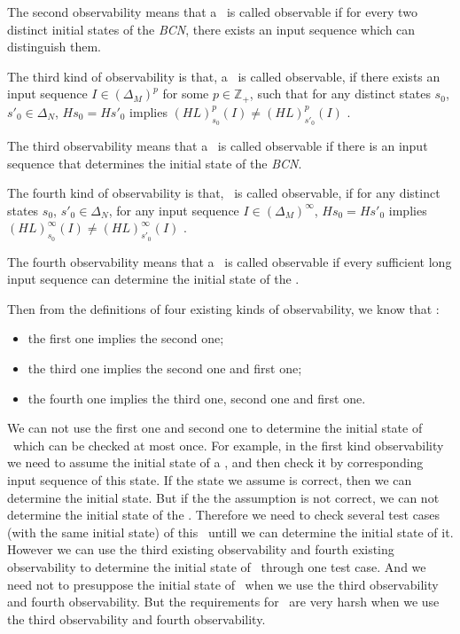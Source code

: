 The second observability means that a \BCN\ is called observable if for every two distinct initial states of the {\em BCN}, there exists an input sequence which can distinguish them. 
\begin{definition}
	The third kind of observability is that, a \BCN\ is called observable, if there exists an input sequence $I\in(\Delta_M)^p$ for some $p\in \mathbb{Z}_+$, such that for any distinct states $s_0$, ${s'}_0 \in \Delta_N$, $Hs_0=H{s'}_0$ implies $(HL)^p_{s_0}(I)\neq (HL)^p_{{s'}_0}(I)$ \cite{Cheng2011Identification}.
\end{definition}

The third observability means that a \BCN\ is called observable if there is an input sequence that determines the initial state of the {\em BCN}.
\begin{definition}
	The fourth kind of observability is that, \BCN\ is called observable, if for any distinct states $s_0$, ${s'}_0 \in \Delta_N$, for any input sequence $I\in(\Delta_M)^{\infty}$, $Hs_0=H{s'}_0$ implies $(HL)^{\infty}_{s_0}(I)\neq (HL)^{\infty}_{{s'}_0}(I)$ \cite{Fornasini2013Observability}.
\end{definition}

The fourth observability means that a \BCN\ is called observable if every sufficient long input sequence can determine the initial state of the \BCN.

Then from the definitions of  four existing kinds of observability, we know that \cite{Zhang2016Observability}:
\begin{itemize}
  \item the first one implies the second one;
  \item the third one implies the second one and first one;
  \item the fourth one implies the third one, second one and first one.
\end{itemize} 
 
We can not use the first one and second one to determine the initial state of \BCNs\ which can be checked at most once. For example, in the first kind observability we need to assume the initial state of a \BCN, and then check it by corresponding input sequence of this state. If the state we assume is correct, then we can determine the initial state. But if the the assumption is not correct, we can not determine the initial state of the \BCN. Therefore we need to check several test cases (with the same initial state) of this \BCN\ untill we can determine the initial state of it. However we can use the third existing observability and fourth existing observability to determine the initial state of \BCNs\ through one test case. And we need not to presuppose the initial state of \BCNs\ when we use the third observability and fourth observability. But the requirements for \BCNs\ are very harsh when we use the third observability and fourth observability.
 
